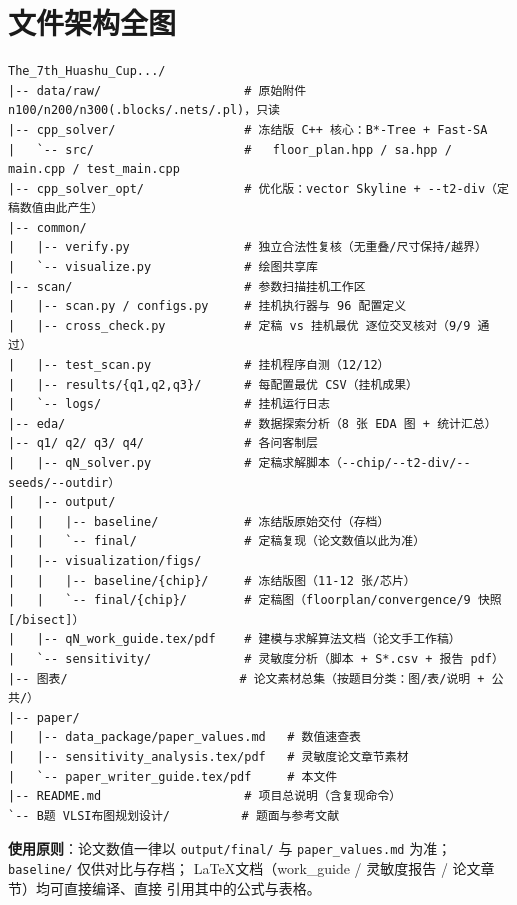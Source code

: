 \documentclass[12pt,a4paper]{article}
\begin{document}
\section{文件架构全图}

{\scriptsize
\begin{verbatim}
The_7th_Huashu_Cup.../
|-- data/raw/                    # 原始附件 n100/n200/n300(.blocks/.nets/.pl)，只读
|-- cpp_solver/                  # 冻结版 C++ 核心：B*-Tree + Fast-SA
|   `-- src/                     #   floor_plan.hpp / sa.hpp / main.cpp / test_main.cpp
|-- cpp_solver_opt/              # 优化版：vector Skyline + --t2-div（定稿数值由此产生）
|-- common/
|   |-- verify.py                # 独立合法性复核（无重叠/尺寸保持/越界）
|   `-- visualize.py             # 绘图共享库
|-- scan/                        # 参数扫描挂机工作区
|   |-- scan.py / configs.py     # 挂机执行器与 96 配置定义
|   |-- cross_check.py           # 定稿 vs 挂机最优 逐位交叉核对（9/9 通过）
|   |-- test_scan.py             # 挂机程序自测（12/12）
|   |-- results/{q1,q2,q3}/      # 每配置最优 CSV（挂机成果）
|   `-- logs/                    # 挂机运行日志
|-- eda/                         # 数据探索分析（8 张 EDA 图 + 统计汇总）
|-- q1/ q2/ q3/ q4/              # 各问客制层
|   |-- qN_solver.py             # 定稿求解脚本（--chip/--t2-div/--seeds/--outdir）
|   |-- output/
|   |   |-- baseline/            # 冻结版原始交付（存档）
|   |   `-- final/               # 定稿复现（论文数值以此为准）
|   |-- visualization/figs/
|   |   |-- baseline/{chip}/     # 冻结版图（11-12 张/芯片）
|   |   `-- final/{chip}/        # 定稿图（floorplan/convergence/9 快照[/bisect]）
|   |-- qN_work_guide.tex/pdf    # 建模与求解算法文档（论文手工作稿）
|   `-- sensitivity/             # 灵敏度分析（脚本 + S*.csv + 报告 pdf）
|-- 图表/                        # 论文素材总集（按题目分类：图/表/说明 + 公共/）
|-- paper/
|   |-- data_package/paper_values.md   # 数值速查表
|   |-- sensitivity_analysis.tex/pdf   # 灵敏度论文章节素材
|   `-- paper_writer_guide.tex/pdf     # 本文件
|-- README.md                    # 项目总说明（含复现命令）
`-- B题 VLSI布图规划设计/          # 题面与参考文献
\end{verbatim}
}

\textbf{使用原则}：论文数值一律以 \texttt{output/final/} 与
\texttt{paper\_values.md} 为准；\texttt{baseline/} 仅供对比与存档；
\LaTeX 文档（work\_guide / 灵敏度报告 / 论文章节）均可直接编译、直接
引用其中的公式与表格。
\end{document}
